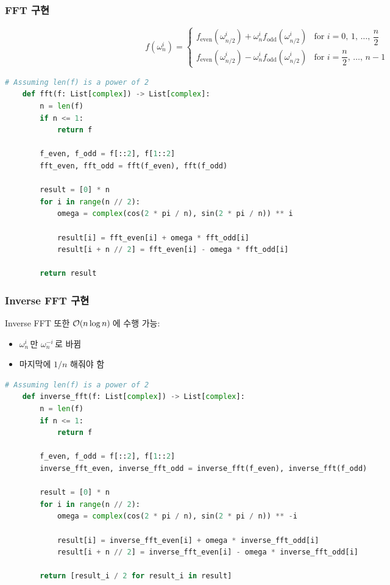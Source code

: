 \begin{frame}[fragile]
    \frametitle{FFT 구현} \small
    \[
        f(\omega_n^{i}) = \begin{cases}
            f_{\mathrm{even}}(\omega_{n/2}^i) + \omega_{n}^i f_{\mathrm{odd}}(\omega_{n/2}^i) & \text{for } i = 0,\, 1,\, \dots,\, \dfrac{n}{2} \\
            f_{\mathrm{even}}(\omega_{n/2}^i) - \omega_{n}^i f_{\mathrm{odd}}(\omega_{n/2}^i) & \text{for } i = \dfrac{n}{2},\, \dots,\, n - 1
        \end{cases}
    \]

    \begin{lstlisting}[language=Python]
    # Assuming len(f) is a power of 2
    def fft(f: List[complex]) -> List[complex]:
        n = len(f)
        if n <= 1:
            return f

        f_even, f_odd = f[::2], f[1::2]
        fft_even, fft_odd = fft(f_even), fft(f_odd)

        result = [0] * n
        for i in range(n // 2):
            omega = complex(cos(2 * pi / n), sin(2 * pi / n)) ** i

            result[i] = fft_even[i] + omega * fft_odd[i]
            result[i + n // 2] = fft_even[i] - omega * fft_odd[i]

        return result
\end{lstlisting}
\end{frame}

\begin{frame}[fragile]
    \frametitle{Inverse FFT 구현} \small
    Inverse FFT 또한 \(\mathcal{O}(n \log n)\)\,에 수행 가능:
    \begin{itemize}
        \item \(\omega_n^i\)\,만 \(\omega_n^{-i}\)\,로 바뀜
        \item 마지막에 \(1/n\) 해줘야 함
    \end{itemize}

    \begin{lstlisting}[language=Python]
    # Assuming len(f) is a power of 2
    def inverse_fft(f: List[complex]) -> List[complex]:
        n = len(f)
        if n <= 1:
            return f

        f_even, f_odd = f[::2], f[1::2]
        inverse_fft_even, inverse_fft_odd = inverse_fft(f_even), inverse_fft(f_odd)

        result = [0] * n
        for i in range(n // 2):
            omega = complex(cos(2 * pi / n), sin(2 * pi / n)) ** -i

            result[i] = inverse_fft_even[i] + omega * inverse_fft_odd[i]
            result[i + n // 2] = inverse_fft_even[i] - omega * inverse_fft_odd[i]

        return [result_i / 2 for result_i in result]
\end{lstlisting}
\end{frame}

